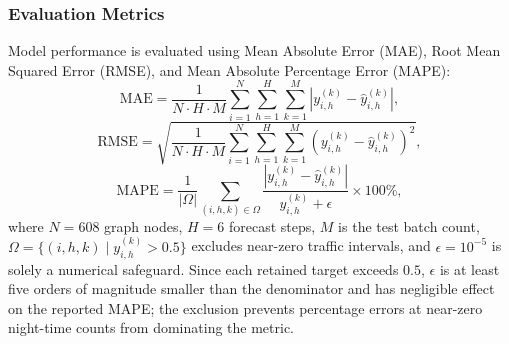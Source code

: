 \documentclass[journal,twocolumn]{IEEEtran}
\begin{document}
\subsubsection{Evaluation Metrics}
Model performance is evaluated using Mean Absolute Error (MAE), Root Mean Squared Error (RMSE), and Mean Absolute Percentage Error (MAPE):
\begin{equation}
\text{MAE} = \frac{1}{N \cdot H \cdot M} \sum_{i=1}^{N} \sum_{h=1}^{H} \sum_{k=1}^{M} \left| y_{i,h}^{(k)} - \hat{y}_{i,h}^{(k)} \right|,
\end{equation}
\begin{equation}
\text{RMSE} = \sqrt{ \frac{1}{N \cdot H \cdot M} \sum_{i=1}^{N} \sum_{h=1}^{H} \sum_{k=1}^{M} \left( y_{i,h}^{(k)} - \hat{y}_{i,h}^{(k)} \right)^2 },
\end{equation}
\begin{equation}
\text{MAPE} = \frac{1}{|\Omega|} \sum_{(i,h,k) \in \Omega} \frac{\left| y_{i,h}^{(k)} - \hat{y}_{i,h}^{(k)} \right|}{y_{i,h}^{(k)} + \epsilon} \times 100\%,
\end{equation}
where $N=608$ graph nodes, $H=6$ forecast steps, $M$ is the test batch count, $\Omega = \{ (i,h,k) \mid y_{i,h}^{(k)} > 0.5 \}$ excludes near-zero traffic intervals, and $\epsilon = 10^{-5}$ is solely a numerical safeguard. Since each retained target exceeds $0.5$, $\epsilon$ is at least five orders of magnitude smaller than the denominator and has negligible effect on the reported MAPE; the exclusion prevents percentage errors at near-zero night-time counts from dominating the metric.
\end{document}

